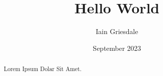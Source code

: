\documentclass{article}
\title{Hello World}
\author{Iain Griesdale}
\date{September 2023}
\begin{document}
\maketitle

\begin{abstract}
    Lorem Ipsum Dolar Sit Amet.
\end{abstract}
\end{document}
